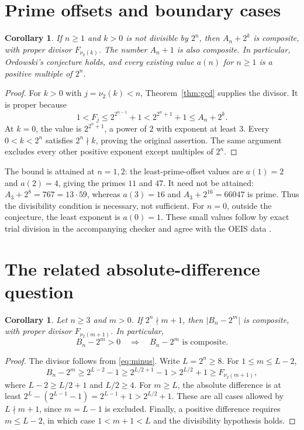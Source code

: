 \documentclass[11pt]{article}
\newtheorem{corollary}[theorem]{Corollary}
\newcommand{\vTwo}{\nu_2}
\begin{document}
\section{Prime offsets and boundary cases}
\begin{corollary}\label{cor:ordowski}
If $n\geq1$ and $k>0$ is not divisible by $2^n$, then $A_n+2^k$
is composite, with proper divisor $F_{\vTwo(k)}$.
The number $A_n+1$ is also composite.
In particular, Ordowski's conjecture holds, and every existing value
$a(n)$ for $n\geq1$ is a positive multiple of $2^n$.
\end{corollary}
\begin{proof}
For $k>0$ with $j=\vTwo(k)<n$, Theorem~\ref{thm:gcd} supplies the divisor.
It is proper because
\[
 1<F_j\leq2^{2^{n-1}}+1
   <2^{2^n+1}+1\leq A_n+2^k.
\]
At $k=0$, the value is $2^{2^n+1}$, a power of $2$ with exponent
at least $3$. Every $0<k<2^n$ satisfies $2^n\nmid k$, proving the
original assertion. The same argument excludes every other positive
exponent except multiples of $2^n$.
\end{proof}

The bound is attained at $n=1,2$: the least-prime-offset values are
$a(1)=2$ and $a(2)=4$, giving the primes $11$ and $47$.
It need not be attained: $A_3+2^8=767=13\cdot59$, whereas $a(3)=16$
and $A_3+2^{16}=66047$ is prime.
Thus the divisibility condition is necessary, not sufficient.
For $n=0$, outside the conjecture, the least exponent is $a(0)=1$.
These small values follow by exact trial division in the accompanying
checker and agree with the OEIS data \cite{oeis}.

\section{The related absolute-difference question}
\begin{corollary}\label{cor:negative}
Let $n\geq3$ and $m>0$. If $2^n\nmid m+1$, then
$\lvert B_n-2^m\rvert$ is composite, with proper divisor
$F_{\vTwo(m+1)}$. In particular,
\[
 B_n-2^m>0\quad\Longrightarrow\quad B_n-2^m
 \text{ is composite}.
\]
\end{corollary}
\begin{proof}
The divisor follows from \eqref{eq:minus}. Write $L=2^n\geq8$.
For $1\leq m\leq L-2$,
\[
 B_n-2^m\geq2^{L-2}-1
  \geq2^{L/2+1}-1>2^{L/2}+1\geq F_{\vTwo(m+1)},
\]
where $L-2\geq L/2+1$ and $L/2\geq4$.
For $m\geq L$, the absolute difference is at least
$2^L-(2^{L-1}-1)=2^{L-1}+1>2^{L/2}+1$.
These are all cases allowed by $L\nmid m+1$, since $m=L-1$ is excluded.
Finally, a positive difference requires $m\leq L-2$, in which case
$1<m+1<L$ and the divisibility hypothesis holds.
\end{proof}
\end{document}
